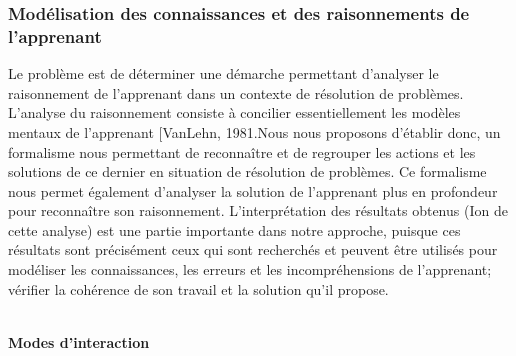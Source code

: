 \subsubsection{Modélisation des connaissances et des raisonnements de
l'apprenant }
Le problème est de déterminer une démarche permettant d'analyser le raisonnement de
l'apprenant dans un contexte de résolution de problèmes. L'analyse du raisonnement
consiste à concilier essentiellement les modèles mentaux de l'apprenant [VanLehn, 1981.Nous nous proposons d'établir donc, un formalisme nous permettant de reconnaître et de regrouper les actions et les solutions de ce dernier en situation de résolution de problèmes. Ce formalisme nous permet également d'analyser la solution de l'apprenant plus en profondeur pour reconnaître son raisonnement. L'interprétation des résultats obtenus (Ion de cette analyse) est une partie importante dans notre approche, puisque ces résultats sont précisément ceux qui sont recherchés et peuvent être utilisés pour modéliser les connaissances, les erreurs et les incompréhensions de l'apprenant; vérifier la cohérence de son travail et la solution qu'il propose. \\\


\textbf{Modes d'interaction} \\\

